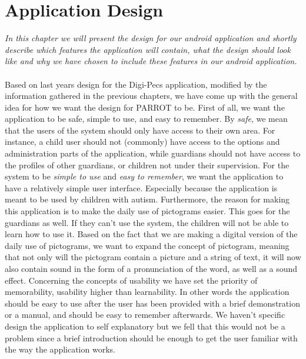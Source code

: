\chapter{Application Design}
\textit{In this chapter we will present the design for our android application and shortly describe which features the application will contain, what the design should look like and why we have chosen to include these features in our android application.}\\
\label{appdes}
\\
Based on last years design for the Digi-Pecs application, modified by the information gathered in the previous chapters, we have come up with the general idea for how we want the design for PARROT to be.\newline
First of all, we want the application to be safe, simple to use, and easy to remember.\newline
By \textit{safe}, we mean that the users of the system should only have access to their own area. For instance, a child user should not (commonly) have access to the options and administration parts of the application, while guardians should not have access to the profiles of other guardians, or children not under their supervision.\newline
For the system to be \textit{simple to use} and \textit{easy to remember}, we want the application to have a relatively simple user interface. Especially because the application is meant to be used by children with autism. Furthermore, the reason for making this application is to make the daily use of pictograms easier. This goes for the guardians as well. If they can't use the system, the children will not be able to learn how to use it.\newline
Based on the fact that we are making a digital version of the daily use of pictograms, we want to expand the concept of pictogram, meaning that not only will the pictogram contain a picture and a string of text, it will now also contain sound in the form of a pronunciation of the word, as well as a sound effect.
Concerning the concepts of usability we have set the priority of memorability, usability higher than learnability. In other words the application should be easy to use after the user has been provided with a brief demonstration or a manual, and should be easy to remember afterwards. We haven't specific design the application to self explanatory but we fell that this would not be a problem since a brief introduction should be enough to get the user familiar with the way the application works.    

